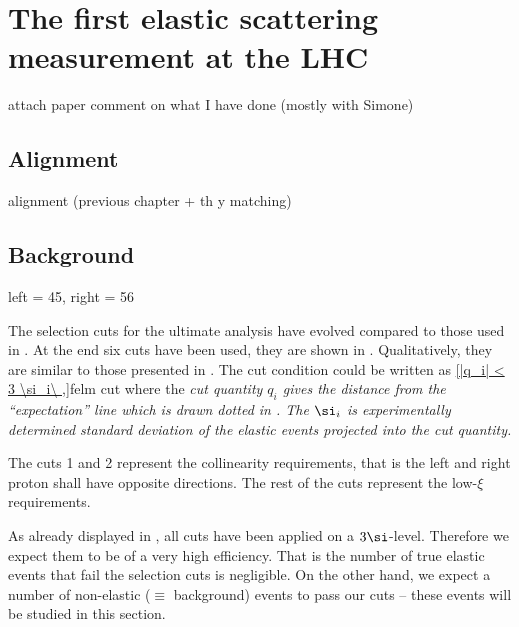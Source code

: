 \def\caption#1{%
	\vskip\baselineskip
	\em{#1}%
	\vskip\baselineskip
}

\iffalse
DPE, SD, MC
\fi

\chapter[felm]{The first elastic scattering measurement at the LHC}

\> attach paper
\> comment on what I have done (mostly with Simone)

\section{Alignment}

\> alignment (previous chapter + th y matching)

\section{Background}

\> left = 45, right = 56

The selection cuts for the ultimate analysis have evolved compared to those used in . At the end six cuts have been used, they are shown in . Qualitatively, they are similar to those presented in . The cut condition could be written as
\eqref{|q_i| < 3 \si_i\ ,}{felm cut}
where the \em{cut quantity} $q_i$ gives the distance from the ``expectation'' line which is drawn dotted in . The $\si_i$ is experimentally determined standard deviation of the elastic events projected into the cut quantity.

The cuts 1 and 2 represent the collinearity requirements, that is the left and right proton shall have opposite directions. The rest of the cuts represent the low-$\xi$ requirements.


As already displayed in , all cuts have been applied on a $3\si$-level. Therefore we expect them to be of a very high efficiency. That is the number of true elastic events that fail the selection cuts is negligible. On the other hand, we expect a number of non-elastic ($\equiv$ background) events to pass our cuts -- these events will be studied in this section.

